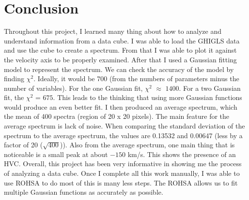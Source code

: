 \documentclass[12pt]{report}
\begin{document}
\section*{Conclusion}
Throughout this project, I learned many thing about how to analyze and understand information from a data cube.
I was able to load the GHIGLS data and use the cube to create a spectrum. 
From that I was able to plot it against the velocity axis to be properly examined.
After that I used a Gaussian fitting model to represent the spectrum. We can check the accuracy of the model by finding $\chi^{2}$. 
Ideally, it would be 700 (from the numbers of parameters minus the number of variables).
For the one Gaussian fit, $\chi^{2}$ $\approx$ $1400$. For a two Gaussian fit, the $\chi^{2}$ = $675$.
This leads to the thinking that using more Gaussian functions would produce an even better fit.
I then produced an average spectrum, which the mean of 400 spectra (region of 20 x 20 pixels).
The main feature for the average spectrum is lack of noise.
When comparing the standard deviation of the spectrum to the average spectrum, the values are 0.13532 and 0.00647 (less by a factor of 20 ($\sqrt{400}$)). 
Also from the average spectrum, one main thing that is noticeable is a small peak at about $-150$ km/s.
This shows the presence of an HVC. 
Overall, this project has been very informative in showing me the process of analyzing a data cube. 
Once I complete all this work manually, I was able to use ROHSA to do most of this is many less steps. 
The ROHSA allows us to fit multiple Gaussian functions as accurately as possible.
\end{document}
